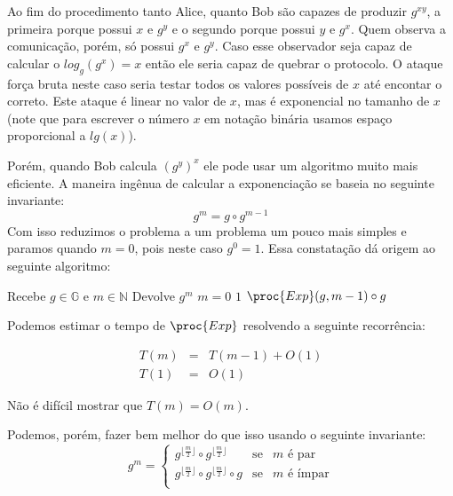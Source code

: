 Ao fim do procedimento tanto Alice, quanto Bob são capazes de produzir $g^{xy}$, a primeira porque possui $x$ e $g^y$ e o segundo porque possui $y$ e $g^x$.
Quem observa a comunicação, porém, só possui $g^x$ e $g^y$.
Caso esse observador seja capaz de calcular o $log_g(g^x) = x$ então ele seria capaz de quebrar o protocolo.
O ataque força bruta neste caso seria testar todos os valores possíveis de $x$ até encontar o correto.
Este ataque é linear no valor de $x$, mas é exponencial no tamanho de $x$ (note que para escrever o número $x$ em notação binária usamos espaço proporcional a $lg(x)$).

Porém, quando Bob calcula $(g^{y})^x$ ele pode usar um algoritmo muito mais eficiente.
A maneira ingênua de calcular a exponenciação se baseia no seguinte invariante:
\begin{displaymath}
  g^m = g \circ g^{m-1}
\end{displaymath}
Com isso reduzimos o problema a um problema um pouco mais simples e paramos quando $m = 0$, pois neste caso $g^0 = 1$.
Essa constatação dá origem ao seguinte algoritmo:

\begin{codebox}
\li \Comment Recebe $g \in \mathbb{G}$ e $m \in \mathbb{N}$
\li \Comment Devolve $g^m$
\li \If $m = 0 $ 
\li \Then \Return $1$
\End
\li \Return $\proc{Exp}(g, m-1) \circ g$
\End
\end{codebox}

Podemos estimar o tempo de $\proc{Exp}$ resolvendo a seguinte recorrência:

\begin{eqnarray*}
  T(m) & = & T(m - 1) + O(1)\\
  T(1) & = & O(1)
\end{eqnarray*}

Não é difícil mostrar que $T(m) = O(m)$.

Podemos, porém, fazer bem melhor do que isso usando o seguinte invariante:
\begin{displaymath}
  g^m = \left\{ 
    \begin{array}{lcl}
      g^{\lfloor \frac{m}{2} \rfloor} \circ  g^{\lfloor \frac{m}{2} \rfloor} & \textrm{se} & m \textrm{ é par}\\
      g^{\lfloor \frac{m}{2} \rfloor} \circ  g^{\lfloor \frac{m}{2} \rfloor} \circ g & \textrm{se} & m \textrm{ é ímpar}\\  
    \end{array}
    \right.
\end{displaymath}

